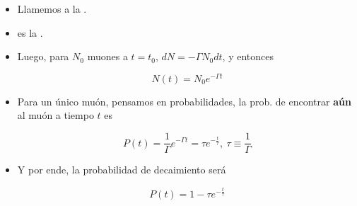 \documentclass[xetex,mathserif,serif,10pt]{beamer}
\newcommand{\bblock}[1]{{\color{chart12}{#1}}}
\newcommand{\be}[2]{
  \vspace{-0.5em}
  \begin{equation}\label{#2}
    #1
  \end{equation}
  \vspace{-1em}
}
\begin{document}
\begin{frame}
\begin{columns}
    \begin{itemize}
      \item Llamemos \bblock{$\Gamma$} a la \bblock{probabilidad de decaimiento por unidad de tiempo}. 
      \item \bblock{$\Gamma$} es la \bblock{tasa de decaimiento}. 
      \item Luego, para $N_0$ muones a $t=t_0$, $dN=-\Gamma N_0 dt$, y entonces
        \be{N(t)=N_0 e^{-\Gamma t}}{EQLexp}
      \item Para un único muón, pensamos en probabilidades, la prob. de encontrar {\bf aún} al muón a tiempo $t$ es 
        \begin{alertblock}{}
          \be{P(t) = \frac1\Gamma e^{-\Gamma t} = \tau e^{-{\frac t\tau}},\ \tau\equiv\frac1\Gamma}{EQPexp}
        \end{alertblock}
      \item Y por ende, la probabilidad de decaimiento será 
        \be{P(t) = 1 - \tau e^{-{\frac t\tau}}}{EQPdec}
    \end{itemize}
  \end{columns}
\end{frame}
\end{document}
